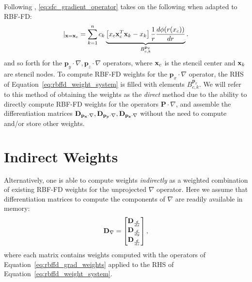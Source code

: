 Following \cite{FlyerLehto11}, \ref{eq:sfc_gradient_operator} takes on the following when adapted to RBF-FD:  
\begin{equation}
[ \mathbf{p}_{x} \cdot \nabla{f(\vx)}] |_{\vx = \vx_{c}} = \sum_{k=1}^{n} c_{k} \underbrace{\left[ x_{c} \vx_{c}^{T} \vx_{k} - x_{k} \right] \frac{1}{r} \d{\phi(r(x_{c}))}{r}}_{B_{c,k}^{\mathbf{p}_{x}}}. 
\label{eq:xsfc_operator_flyer_et_al}
\end{equation}
and so forth for the $\mathbf{p}_{y} \cdot \nabla, \mathbf{p}_{z}  \cdot \nabla$ operators, where $\mathbf{x}_{c}$ is the stencil center and $\mathbf{x}_{k}$ are stencil nodes. To compute RBF-FD weights for the $\mathbf{p}_{x} \cdot \nabla$ operator, the RHS of Equation~\ref{eq:rbffd_weight_system} is filled with elements $B_{c,k}^{\mathbf{p}_{x}}$. We will refer to this method of obtaining the weights as the \emph{direct} method due to the ability to directly compute RBF-FD weights for the operators $\mathbf{P} \cdot \nabla $, and assemble the differentiation matrices $\mathbf{D}_{\mathbf{p_{x}} \cdot \nabla}, \mathbf{D}_{\mathbf{p_{y}} \cdot \nabla}, \mathbf{D}_{\mathbf{p_{z}} \cdot \nabla}$ without the need to compute   and/or store other weights.

\section{Indirect Weights} 

Alternatively, one is able to compute weights \emph{indirectly} as a weighted combination of existing RBF-FD weights for the unprojected $\nabla$ operator. Here we assume that differentiation matrices to compute the components of $\nabla$ are readily available in memory: 
$$
\mathbf{D}_{\nabla} = \begin{bmatrix} \mathbf{D}_{\frac{d }{d x}} \\ \mathbf{D}_{\frac{d }{d y}} \\ \mathbf{D}_{\frac{d }{d z}} \end{bmatrix},
$$
where each matrix contains weights computed with the operators of Equation~\ref{eq:rbffd_grad_weights} applied to the RHS of Equation~\ref{eq:rbffd_weight_system}.  

